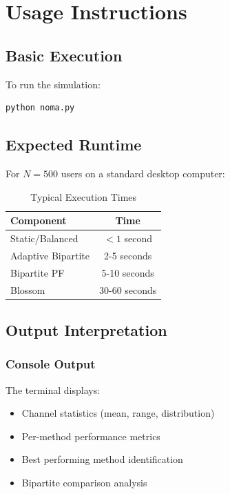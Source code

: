 \documentclass[12pt,a4paper]{article}
\begin{document}
\section{Usage Instructions}

\subsection{Basic Execution}

To run the simulation:

\begin{verbatim}
python noma.py
\end{verbatim}

\subsection{Expected Runtime}

For $N=500$ users on a standard desktop computer:

\begin{table}[h]
\centering
\caption{Typical Execution Times}
\begin{tabular}{lc}
\toprule
\textbf{Component} & \textbf{Time} \\
\midrule
Static/Balanced & $< 1$ second \\
Adaptive Bipartite & 2-5 seconds \\
Bipartite PF & 5-10 seconds \\
Blossom & 30-60 seconds \\
\bottomrule
\end{tabular}
\end{table}

\subsection{Output Interpretation}

\subsubsection{Console Output}

The terminal displays:
\begin{itemize}
    \item Channel statistics (mean, range, distribution)
    \item Per-method performance metrics
    \item Best performing method identification
    \item Bipartite comparison analysis
\end{itemize}
\end{document}
